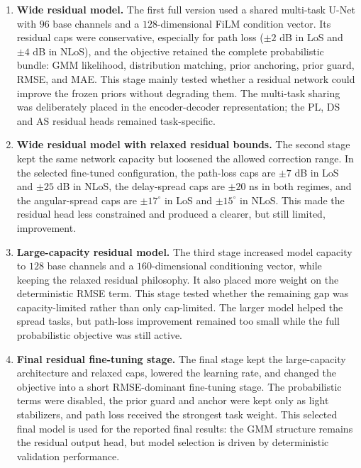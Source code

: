 \begin{enumerate}
\item \textbf{Wide residual model.} The first full version used a shared multi-task
U-Net with \(96\) base channels and a \(128\)-dimensional FiLM condition
vector. Its residual caps were conservative, especially for path loss
(\(\pm2\) dB in LoS and \(\pm4\) dB in NLoS), and the objective retained the
complete probabilistic bundle: GMM likelihood, distribution matching,
prior anchoring, prior guard, RMSE, and MAE. This stage mainly tested whether
a residual network could improve the frozen priors without degrading them. The
multi-task sharing was deliberately placed in the encoder-decoder representation;
the PL, DS and AS residual heads remained task-specific.

\item \textbf{Wide residual model with relaxed residual bounds.} The second stage kept the same
network capacity but loosened the allowed correction range. In the selected
fine-tuned configuration, the path-loss caps are \(\pm7\) dB in LoS and
\(\pm25\) dB in NLoS, the delay-spread caps are \(\pm20\) ns in both regimes,
and the angular-spread caps are \(\pm17^\circ\) in LoS and \(\pm15^\circ\) in
NLoS. This made the residual head less constrained and produced a
clearer, but still limited, improvement.

\item \textbf{Large-capacity residual model.} The third stage increased model
capacity to \(128\) base channels and a \(160\)-dimensional conditioning
vector, while keeping the relaxed residual philosophy. It also placed more
weight on the deterministic RMSE term. This stage tested whether the remaining
gap was capacity-limited rather than only cap-limited. The larger model helped
the spread tasks, but path-loss improvement remained too small while the full
probabilistic objective was still active.

\item \textbf{Final residual fine-tuning stage.} The final stage kept the
large-capacity architecture and relaxed caps, lowered the learning rate, and
changed the objective into a short RMSE-dominant fine-tuning stage. The
probabilistic terms were disabled, the prior guard and anchor were kept only
as light stabilizers, and path loss received the strongest task weight. This
selected final model is used for the reported final results: the GMM structure
remains the residual output head, but model selection is driven by
deterministic validation performance.
\end{enumerate}

